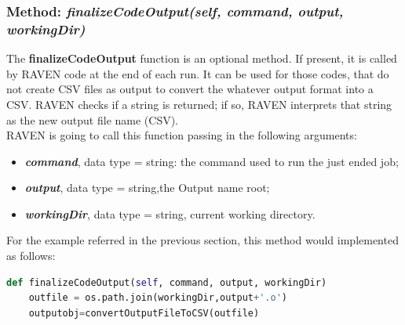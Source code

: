 \subsubsection{Method: \textit{finalizeCodeOutput(self, command, output, workingDir)}} 
\label{subsubsec:finializeCodeOutput}
The \textbf{finalizeCodeOutput} function is an optional method. If present, it is called 
by RAVEN code at the end of each run. It can be used for those codes, that do not create CSV 
files as output to convert the whatever output format into a CSV. RAVEN checks if a string is returned; 
if so, RAVEN interprets that string as the new output file name (CSV).
\\RAVEN is going to call this function passing in the following arguments:
\begin{itemize}
  \item \textbf{\textit{command}}, data type = string: the command used to run 
                    the just ended job;
  \item \textbf{\textit{output}}, data type = string,the Output name root;
  \item  \textbf{\textit{workingDir}}, data type = string, current working directory.
\end{itemize}
For the example referred in the previous section, this method would implemented as follows:
\newline
\begin{lstlisting}[language=python]
def finalizeCodeOutput(self, command, output, workingDir)
    outfile = os.path.join(workingDir,output+'.o')
    outputobj=convertOutputFileToCSV(outfile)
 \end{lstlisting} 


